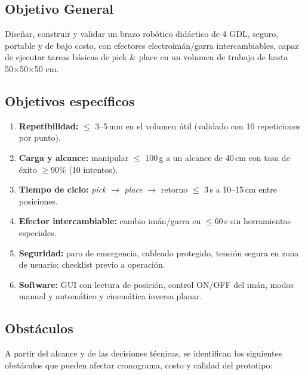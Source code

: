 \subsection{Objetivo General}
Diseñar, construir y validar un brazo robótico didáctico de 4 GDL, seguro, portable y de bajo costo, con efectores electroimán/garra intercambiables, capaz de ejecutar tareas básicas de pick \& place en un volumen de trabajo de hasta 50×50×50 cm.

\subsection{Objetivos específicos}
\begin{enumerate}
  \item \textbf{Repetibilidad:} $\leq$ 3--5\,mm en el volumen útil (validado con 10 repeticiones por punto).
  \item \textbf{Carga y alcance:} manipular $\leq$ 100\,g a un alcance de 40\,cm con tasa de éxito $\geq 90\%$ (10 intentos).
  \item \textbf{Tiempo de ciclo:} \emph{pick} $\rightarrow$ \emph{place} $\rightarrow$ retorno $\leq$ 3\,s a 10--15\,cm entre posiciones.
  \item \textbf{Efector intercambiable:} cambio imán/garra en $\leq 60$\,s sin herramientas especiales.
  \item \textbf{Seguridad:} paro de emergencia, cableado protegido, tensión segura en zona de usuario; checklist previo a operación.
  \item \textbf{Software:} GUI con lectura de posición, control ON/OFF del imán, modos manual y automático y cinemática inversa planar.
\end{enumerate}

\subsection{Obstáculos}
A partir del alcance y de las decisiones técnicas, se identifican los siguientes obstáculos que pueden afectar cronograma, costo y calidad del prototipo:

